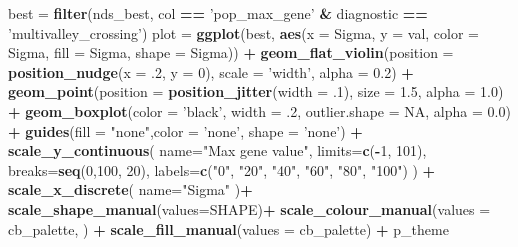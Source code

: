 \documentclass[]{book}
\newenvironment{Shaded}{\begin{snugshade}}{\end{snugshade}}
\newcommand{\DataTypeTok}[1]{\textcolor[rgb]{0.13,0.29,0.53}{#1}}
\newcommand{\DecValTok}[1]{\textcolor[rgb]{0.00,0.00,0.81}{#1}}
\newcommand{\FloatTok}[1]{\textcolor[rgb]{0.00,0.00,0.81}{#1}}
\newcommand{\KeywordTok}[1]{\textcolor[rgb]{0.13,0.29,0.53}{\textbf{#1}}}
\newcommand{\NormalTok}[1]{#1}
\newcommand{\OperatorTok}[1]{\textcolor[rgb]{0.81,0.36,0.00}{\textbf{#1}}}
\newcommand{\OtherTok}[1]{\textcolor[rgb]{0.56,0.35,0.01}{#1}}
\newcommand{\StringTok}[1]{\textcolor[rgb]{0.31,0.60,0.02}{#1}}
\begin{document}
\begin{Shaded}
\begin{Highlighting}[]
\NormalTok{best =}\StringTok{ }\KeywordTok{filter}\NormalTok{(nds_best, col }\OperatorTok{==}\StringTok{ 'pop_max_gene'} \OperatorTok{&}\StringTok{ }\NormalTok{diagnostic }\OperatorTok{==}\StringTok{ 'multivalley_crossing'}\NormalTok{)}
\NormalTok{plot =}\StringTok{  }\KeywordTok{ggplot}\NormalTok{(best, }\KeywordTok{aes}\NormalTok{(}\DataTypeTok{x =}\NormalTok{ Sigma, }\DataTypeTok{y =}\NormalTok{ val, }\DataTypeTok{color =}\NormalTok{ Sigma, }\DataTypeTok{fill =}\NormalTok{ Sigma, }\DataTypeTok{shape =}\NormalTok{ Sigma)) }\OperatorTok{+}
\StringTok{          }\KeywordTok{geom_flat_violin}\NormalTok{(}\DataTypeTok{position =} \KeywordTok{position_nudge}\NormalTok{(}\DataTypeTok{x =} \FloatTok{.2}\NormalTok{, }\DataTypeTok{y =} \DecValTok{0}\NormalTok{), }\DataTypeTok{scale =} \StringTok{'width'}\NormalTok{, }\DataTypeTok{alpha =} \FloatTok{0.2}\NormalTok{) }\OperatorTok{+}
\StringTok{          }\KeywordTok{geom_point}\NormalTok{(}\DataTypeTok{position =} \KeywordTok{position_jitter}\NormalTok{(}\DataTypeTok{width =} \FloatTok{.1}\NormalTok{), }\DataTypeTok{size =} \FloatTok{1.5}\NormalTok{, }\DataTypeTok{alpha =} \FloatTok{1.0}\NormalTok{) }\OperatorTok{+}
\StringTok{          }\KeywordTok{geom_boxplot}\NormalTok{(}\DataTypeTok{color =} \StringTok{'black'}\NormalTok{, }\DataTypeTok{width =} \FloatTok{.2}\NormalTok{, }\DataTypeTok{outlier.shape =} \OtherTok{NA}\NormalTok{, }\DataTypeTok{alpha =} \FloatTok{0.0}\NormalTok{) }\OperatorTok{+}
\StringTok{          }\KeywordTok{guides}\NormalTok{(}\DataTypeTok{fill =} \StringTok{"none"}\NormalTok{,}\DataTypeTok{color =} \StringTok{'none'}\NormalTok{, }\DataTypeTok{shape =} \StringTok{'none'}\NormalTok{) }\OperatorTok{+}
\StringTok{          }\KeywordTok{scale_y_continuous}\NormalTok{(}
          \DataTypeTok{name=}\StringTok{"Max gene value"}\NormalTok{,}
          \DataTypeTok{limits=}\KeywordTok{c}\NormalTok{(}\OperatorTok{-}\DecValTok{1}\NormalTok{, }\DecValTok{101}\NormalTok{),}
          \DataTypeTok{breaks=}\KeywordTok{seq}\NormalTok{(}\DecValTok{0}\NormalTok{,}\DecValTok{100}\NormalTok{, }\DecValTok{20}\NormalTok{),}
          \DataTypeTok{labels=}\KeywordTok{c}\NormalTok{(}\StringTok{"0"}\NormalTok{, }\StringTok{"20"}\NormalTok{, }\StringTok{"40"}\NormalTok{, }\StringTok{"60"}\NormalTok{, }\StringTok{"80"}\NormalTok{, }\StringTok{"100"}\NormalTok{)}
\NormalTok{          ) }\OperatorTok{+}
\StringTok{          }\KeywordTok{scale_x_discrete}\NormalTok{(}
            \DataTypeTok{name=}\StringTok{"Sigma"}
\NormalTok{          )}\OperatorTok{+}
\StringTok{          }\KeywordTok{scale_shape_manual}\NormalTok{(}\DataTypeTok{values=}\NormalTok{SHAPE)}\OperatorTok{+}
\StringTok{          }\KeywordTok{scale_colour_manual}\NormalTok{(}\DataTypeTok{values =}\NormalTok{ cb_palette, ) }\OperatorTok{+}
\StringTok{          }\KeywordTok{scale_fill_manual}\NormalTok{(}\DataTypeTok{values =}\NormalTok{ cb_palette) }\OperatorTok{+}
\StringTok{          }\NormalTok{p_theme}


\end{Highlighting}
\end{Shaded}
\end{document}
